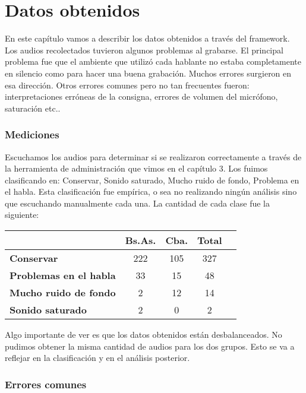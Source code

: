\chapter{Datos obtenidos}

En este capítulo vamos a describir los datos obtenidos a través del framework. Los audios recolectados tuvieron algunos problemas al grabarse. El principal problema fue que el ambiente que utilizó cada hablante no estaba completamente en silencio como para hacer una buena grabación. Muchos errores surgieron en esa dirección. Otros errores comunes pero no tan frecuentes fueron: interpretaciones erróneas de la consigna, errores de volumen del micrófono, saturación etc.. 

\subsection{Mediciones}

Escuchamos los audios para determinar si se realizaron correctamente a través de la herramienta de administración que vimos en el capítulo 3. Los fuimos clasificando en: Conservar, Sonido saturado, Mucho ruido de fondo, Problema en el habla. Esta clasificación fue empírica, o sea no realizando ningún análisis sino que escuchando manualmente cada una. La cantidad de cada clase fue la siguiente:

\begin{table}[h]
\centering
\begin{tabular}{|l|c|c|c|c|}
\hline
\textbf{}  & \textbf{Bs.As. } & \textbf{Cba.} & \textbf{Total} \\ \hline
\textbf{Conservar}  & 222 & 105 & 327 \\ \hline
\textbf{Problemas en el habla}  & 33 & 15 & 48 \\ \hline
\textbf{Mucho ruido de fondo}  & 2 & 12 & 14 \\ \hline
\textbf{Sonido saturado}  & 2 & 0 & 2 \\ \hline
\end{tabular}
\end{table}

Algo importante de ver es que los datos obtenidos están desbalanceados. No pudimos obtener la misma cantidad de audios para los dos grupos. Esto se va a reflejar en la clasificación y en el análisis posterior.

\subsection{Errores comunes}

